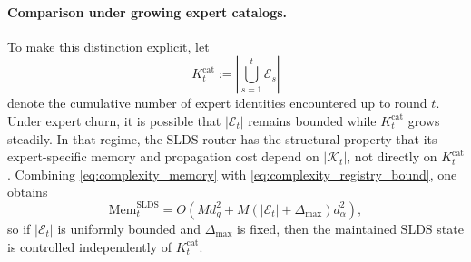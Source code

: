 \paragraph{Comparison under growing expert catalogs.}
To make this distinction explicit, let
\begin{equation}
K_t^{\mathrm{cat}}
:=
\left|
\bigcup_{s=1}^{t} \mathcal E_s
\right|
\end{equation}
denote the cumulative number of expert identities encountered up to round \(t\). Under expert churn, it is possible that \(|\mathcal E_t|\) remains bounded while \(K_t^{\mathrm{cat}}\) grows steadily. In that regime, the SLDS router has the structural property that its expert-specific memory and propagation cost depend on \(|\mathcal K_t|\), not directly on \(K_t^{\mathrm{cat}}\). Combining \eqref{eq:complexity_memory} with \eqref{eq:complexity_registry_bound}, one obtains
\begin{equation}
\mathrm{Mem}_t^{\mathrm{SLDS}}
=
O\!\left(
M d_g^2 + M (|\mathcal E_t|+\Delta_{\max}) d_\alpha^2
\right),
\label{eq:complexity_memory_registry_bound}
\end{equation}
so if \(|\mathcal E_t|\) is uniformly bounded and \(\Delta_{\max}\) is fixed, then the maintained SLDS state is controlled independently of \(K_t^{\mathrm{cat}}\).

